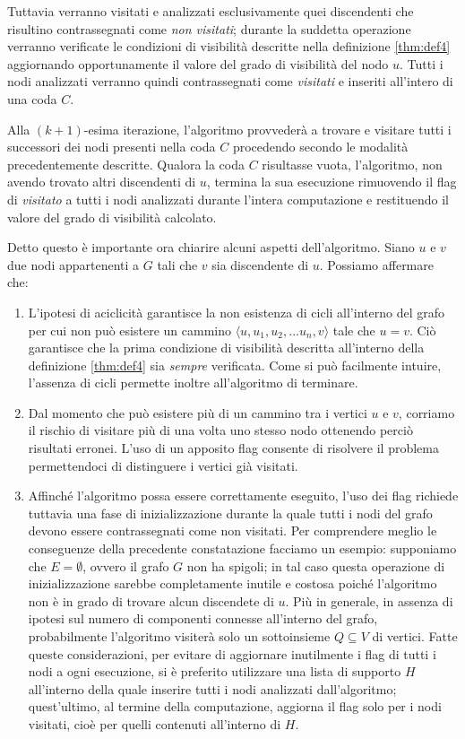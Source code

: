 \documentclass[10pt,a4paper,titlepage]{article}
\begin{document}
Tuttavia verranno visitati e analizzati esclusivamente quei discendenti che risultino contrassegnati come \textit{non visitati}; durante la suddetta operazione verranno verificate le condizioni di visibilità descritte nella definizione \ref{thm:def4} aggiornando opportunamente il valore del grado di visibilità del nodo $u$. Tutti i nodi analizzati verranno quindi contrassegnati come \textit{visitati} e inseriti all'intero di una coda $C$.

Alla $(k+1)$-esima iterazione, l'algoritmo provvederà a trovare e visitare tutti i successori dei nodi presenti nella coda $C$ procedendo secondo le modalità precedentemente descritte. Qualora la coda $C$ risultasse vuota, l'algoritmo, non avendo trovato altri discendenti di $u$, termina la sua esecuzione rimuovendo il flag di \textit{visitato} a tutti i nodi analizzati durante l'intera computazione e restituendo il valore del grado di visibilità calcolato.

Detto questo è importante ora chiarire alcuni aspetti dell'algoritmo. Siano $u$ e $v$ due nodi appartenenti a $G$ tali che $v$ sia discendente di $u$. Possiamo affermare che:

\begin{enumerate}
\item L'ipotesi di aciclicità garantisce la non esistenza di cicli all'interno del grafo per cui non può esistere un cammino $\langle u, u_1, u_2, ...u_n, v\rangle$ tale che $u = v$. Ciò garantisce che la prima condizione di visibilità descritta all'interno della definizione \ref{thm:def4} sia \textit{sempre} verificata. Come si può facilmente intuire, l'assenza di cicli permette inoltre all'algoritmo di terminare.
\item Dal momento che può esistere più di un cammino tra i vertici $u$ e $v$, corriamo il rischio di visitare più di una volta uno stesso nodo ottenendo perciò risultati erronei. L'uso di un apposito flag consente di risolvere il problema permettendoci di distinguere i vertici già visitati.
\item Affinché l'algoritmo possa essere correttamente eseguito, l'uso dei flag richiede tuttavia una fase di inizializzazione durante la quale tutti i nodi del grafo devono essere contrassegnati come non visitati. Per comprendere meglio le conseguenze della precedente constatazione facciamo un esempio: supponiamo che $E=\emptyset$, ovvero il grafo $G$ non ha spigoli; in tal caso questa operazione di inizializzazione sarebbe completamente inutile e costosa poiché l'algoritmo non è in grado di trovare alcun discendete di $u$. Più in generale, in assenza di ipotesi sul numero di componenti connesse all'interno del grafo, probabilmente l'algoritmo visiterà solo un sottoinsieme $Q \subseteq V$ di vertici. Fatte queste considerazioni, per evitare di aggiornare inutilmente i flag di tutti i nodi a ogni esecuzione, si è preferito utilizzare una lista di supporto $H$ all'interno della quale inserire tutti i nodi analizzati dall'algoritmo; quest'ultimo, al termine della computazione, aggiorna il flag solo per i nodi visitati, cioè per quelli contenuti all'interno di $H$.
\end{enumerate}
\end{document}

